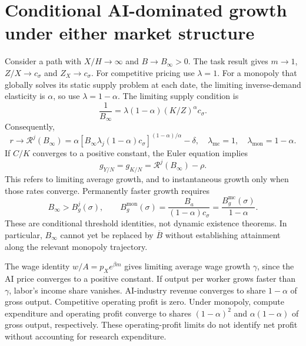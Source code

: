 \documentclass[11pt]{article}
\begin{document}
\section{Conditional AI-dominated growth under either market structure}
Consider a path with $X/H\to\infty$ and $B\to B_\infty>0$.
The task result gives $m\to1$, $Z/X\to c_\sigma$ and $Z_X\to c_\sigma$.
For competitive pricing use $\lambda=1$. For a monopoly that globally solves
its static supply problem at each date, the limiting inverse-demand elasticity
is $\alpha$, so use $\lambda=1-\alpha$. The limiting supply condition is
\[
 \frac1{B_\infty}=\lambda(1-\alpha)(K/Z)^\alpha c_\sigma.
\]
Consequently,
\begin{equation}
 r\longrightarrow\mathcal R^j(B_\infty)
 =\alpha[B_\infty\lambda_j(1-\alpha)c_\sigma]^{(1-\alpha)/\alpha}-\delta,
 \quad \lambda_{\mathrm{mc}}=1,\quad\lambda_{\mathrm{mon}}=1-\alpha.
 \label{eq:regimes-returns}
\end{equation}
If $C/K$ converges to a positive constant, the Euler equation implies
\[
 g_{Y/N}=g_{K/N}=\mathcal R^j(B_\infty)-\rho.
\]
This refers to limiting average growth, and to instantaneous growth only
when those rates converge. Permanently faster growth requires
\begin{equation}
 B_\infty>B_g^j(\sigma),\qquad
 B_g^{\mathrm{mon}}(\sigma)=\frac{B_a}{(1-\alpha)c_\sigma}
 =\frac{B_g^{\mathrm{mc}}(\sigma)}{1-\alpha}.
 \label{eq:regimes-mon-threshold}
\end{equation}
These are conditional threshold identities, not dynamic existence theorems.
In particular, $B_\infty$ cannot yet be replaced by $\overline B$ without
establishing attainment along the relevant monopoly trajectory.

The wage identity $w/A=p_Xe^{\beta m}$ gives limiting average wage growth
$\gamma$, since the AI price converges to a positive constant.
If output per worker grows faster than $\gamma$, labor's income share
vanishes. AI-industry revenue converges to share $1-\alpha$ of gross output.
Competitive operating profit is zero. Under monopoly, compute expenditure
and operating profit converge to shares $(1-\alpha)^2$ and
$\alpha(1-\alpha)$ of gross output, respectively. These operating-profit
limits do not identify net profit without accounting for research expenditure.
\end{document}
